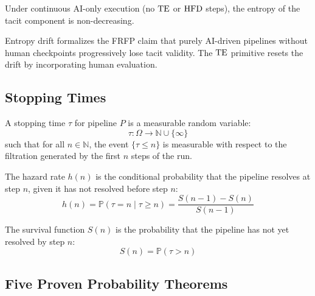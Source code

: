 \begin{theorem}
Under continuous AI-only execution (no $\mathrm{TE}$ or $\mathrm{HFD}$ steps), the entropy of
the tacit component is non-decreasing.
\end{theorem}

Entropy drift formalizes the FRFP claim that purely AI-driven pipelines without
human checkpoints progressively lose tacit validity. The $\mathrm{TE}$ primitive resets
the drift by incorporating human evaluation.

\subsection{Stopping Times}

\begin{definition}
A stopping time $\tau$ for pipeline $P$ is a measurable random variable:
\[
  \tau : \Omega \to \mathbb{N} \cup \{\infty\}
\]
such that for all $n \in \mathbb{N}$, the event $\{\tau \leq n\}$ is measurable
with respect to the filtration generated by the first $n$ steps of the run.

\end{definition}

\begin{definition}
The hazard rate $h(n)$ is the conditional probability that the pipeline resolves
at step $n$, given it has not resolved before step $n$:
\[
  h(n) = \mathbb{P}(\tau = n \mid \tau \geq n)
       = \frac{S(n-1) - S(n)}{S(n-1)}
\]
\end{definition}

\begin{definition}
The survival function $S(n)$ is the probability that the pipeline has not yet
resolved by step $n$:
\[
  S(n) = \mathbb{P}(\tau > n)
\]
\end{definition}

\subsection{Five Proven Probability Theorems}

